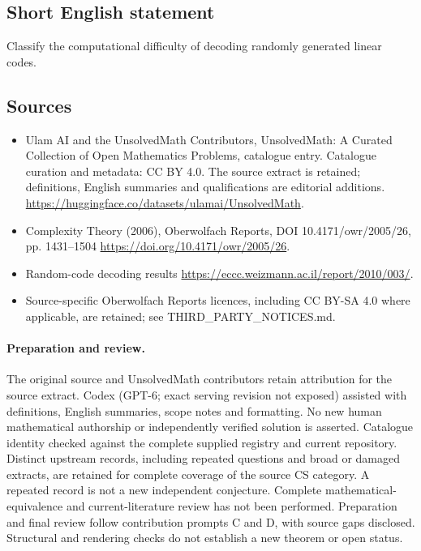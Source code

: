 \documentclass[11pt]{article}
\begin{document}
\subsection{Short English statement}
Classify the computational difficulty of decoding randomly generated linear codes.
\subsection{Sources}
\begin{itemize}
\item[\hypertarget{source:statement:1}{S1}] Ulam AI and the UnsolvedMath Contributors, UnsolvedMath: A Curated Collection of Open Mathematics Problems, catalogue entry. Catalogue curation and metadata: CC BY 4.0. The source extract is retained; definitions, English summaries and qualifications are editorial additions.
\url{https://huggingface.co/datasets/ulamai/UnsolvedMath}.
\item[\hypertarget{source:statement:2}{S2}] Complexity Theory (2006), Oberwolfach Reports, DOI 10.4171/owr/2005/26, pp. 1431--1504
\url{https://doi.org/10.4171/owr/2005/26}.
\item[\hypertarget{source:statement:3}{S3}] Random-code decoding results
\url{https://eccc.weizmann.ac.il/report/2010/003/}.
\item Source-specific Oberwolfach Reports licences, including CC BY-SA 4.0 where applicable, are retained; see THIRD\_PARTY\_NOTICES.md.
\end{itemize}
\paragraph{Preparation and review.}
The original source and UnsolvedMath contributors retain attribution for the source extract. Codex (GPT-6; exact serving revision not exposed) assisted with definitions, English summaries, scope notes and formatting. No new human mathematical authorship or independently verified solution is asserted. Catalogue identity checked against the complete supplied registry and current repository. Distinct upstream records, including repeated questions and broad or damaged extracts, are retained for complete coverage of the source CS category. A repeated record is not a new independent conjecture. Complete mathematical-equivalence and current-literature review has not been performed. Preparation and final review follow contribution prompts C and D, with source gaps disclosed. Structural and rendering checks do not establish a new theorem or open status.
\label{end:statement}
\end{document}
